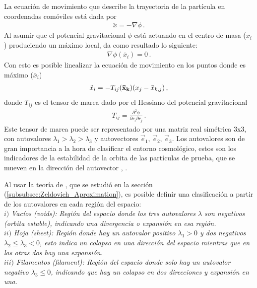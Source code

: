 La ecuación de movimiento que describe la trayectoria de la partícula en coordenadas comóviles está dada por 
\begin{align}
    \ddot{x}=-\nabla\phi\,.
\end{align}
%
Al asumir que el potencial gravitacional $\phi$ está actuando en el centro de masa ($\bar{x}_{i}$) produciendo un máximo local,  da como resultado lo siguiente:
%
\begin{align}
    \nabla\phi(\bar{x}_{i})=0\,.
\end{align}
%
Con esto es posible linealizar la ecuación de movimiento en los puntos donde es máximo ($\bar{x}_{i}$)
%
\begin{align}
    \ddot{x}_{i}=-T_{ij}({\bf{\bar{x}}_{k}})(x_{j}-\bar{x}_{k,j})\,,
\end{align}
%
donde $T_{ij}$ es el tensor de marea dado por el Hessiano del potencial gravitacional
%
\begin{align}
    T_{ij}=\frac{\partial^2 \phi}{\partial r_{i} \partial r_{j}}\,.
\end{align}
%
Este tensor de marea puede ser representado por una matriz real simétrica 3x3, con autovalores $\lambda_{1}>\lambda_{2}>\lambda_{3}$ y  autovectores $\vec{e}_{1},\, \vec{e}_{2},\, \vec{e}_{3}$. Los autovalores son de gran importancia a la hora de clasificar el entorno cosmológico, estos son los indicadores de la estabilidad de la orbita de las partículas de prueba, que se mueven en la dirección del autovector \cite{padmanabhan1995}, \cite{hahn2007}.

Al usar la teoría de \cite{zeldovich1970}, que se estudió en la sección (\ref{subsubsec:Zeldovich_Aproximation}), es posible definir una clasificación a partir de los autovalores en cada región del espacio:\\

$i)$ {\it{Vacíos (voids)}: Región del espacio donde los tres autovalores $\lambda$ son negativos (orbita estable), indicando una divergencia o expansión en esa región.}\\

$ii)$ {\it{Hoja (sheet)}: Región donde hay un autovalor positivo $\lambda_{1}>0$ y dos negativos $\lambda_{2} \leq \lambda_{3}< 0$, esto indica un colapso en una dirección del espacio mientras que en las otras dos hay una expansión.}\\

$iii)$ {\it{Filamentos (filament)}: Región del espacio donde solo hay un autovalor negativo $\lambda_{3}\leq 0$, indicando que hay un colapso en dos direcciones y expansión en una.} \\


